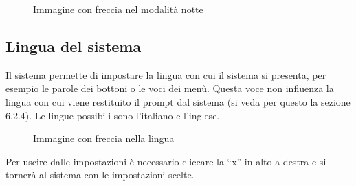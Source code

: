 \begin{figure}[H]
    \centering
    \caption{Immagine con freccia nel modalità notte}
  \end{figure}

\subsection{Lingua del sistema}

Il sistema permette di impostare la lingua con cui il sistema si presenta, per esempio le parole dei bottoni o le voci dei menù. Questa voce non influenza la lingua con cui viene restituito il prompt dal sistema (si veda per questo la sezione 6.2.4). Le lingue possibili sono l'italiano e l'inglese.

\begin{figure}[H]
    \centering
    \caption{Immagine con freccia nella lingua}
  \end{figure}

Per uscire dalle impostazioni è necessario cliccare la ``x'' in alto a destra e si tornerà al sistema con le impostazioni scelte.
